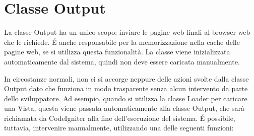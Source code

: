 \section{Classe Output}
\label{class:output}

La classe Output ha un unico scopo: inviare le pagine web finali al browser web che le richiede. \'E anche responsabile per la memorizzazione nella cache delle pagine web, se si utilizza questa funzionalità. La classe viene inizializzata automaticamente dal sistema, quindi non deve essere caricata manualmente.

In circostanze normali, non ci si accorge neppure delle azioni svolte dalla classe Output dato che funziona in modo trasparente senza alcun intervento da parte dello sviluppatore. Ad esempio, quando si utilizza la classe Loader per caricare una Vista, questa viene passata automaticamente alla classe Output, che sarà richiamata da CodeIgniter alla fine dell'esecuzione del sistema. \'E possibile, tuttavia, intervenire manualmente, utilizzando una delle seguenti funzioni:

